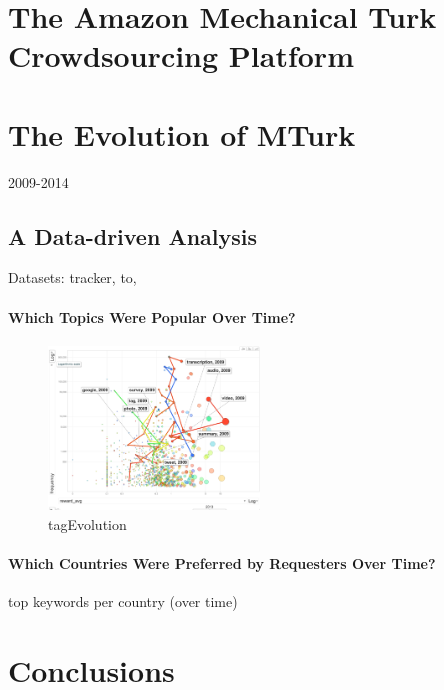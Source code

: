 \documentclass{sig-alternate}
\begin{document}





\section{The Amazon Mechanical Turk Crowdsourcing Platform}

\section{The Evolution of MTurk}
2009-2014
\subsection{A Data-driven Analysis}
Datasets: tracker, to, 
\paragraph{Which Topics Were Popular Over Time?}

\begin{figure}[htbp]
	\centering
		\includegraphics[width=0.5\textwidth]{tagEvolution.png}
	\caption{tagEvolution}
	\label{fig:tagEvolution}
\end{figure}

\paragraph{Which Countries Were Preferred by Requesters Over Time?}
top keywords per country (over time)





\section{Conclusions}



\end{document}

